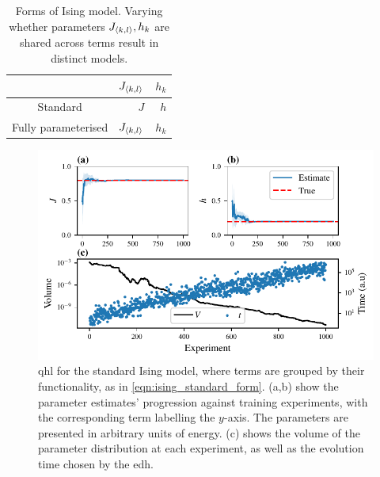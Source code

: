 \begin{table}[H]
    \begin{center}
        \begin{tabular}{crr}
             & $J_{{ \langle k, l \rangle }}$  & $h_{k}$ \\
            \hline
            Standard & $J$ & $h$ \\
            Fully parameterised & $J_{{ \langle k, l \rangle }}$ & $h_{k}$
        \end{tabular}
    \end{center}
    \caption[Forms of Ising model]{Forms of Ising model. Varying whether parameters $J_{{ \langle k, l \rangle }}, h_k$ are shared 
        across terms result in distinct models. 
    }
    \label{table:ising_models}
\end{table}

\par 

\begin{figure}[t]
    \begin{center}
        \includegraphics{theoretical_study/figures/standard_ising_qhl.pdf}
    \end{center}

    \caption[ for the standard Ising model]{
        \Acrlong{qhl} for the standard Ising model, where terms are grouped by their functionality, 
        as in \cref{eqn:ising_standard_form}. 
        (a,b) show the parameter estimates' progression against training experiments, 
            with the corresponding term labelling the $y$-axis. 
        The parameters are presented in arbitrary units of energy. 
        (c) shows the \gls{volume} of the parameter distribution at each experiment, 
            as well as the evolution time chosen by the \gls{edh}. 
        \figtableref
    }
    \label{fig:ising_two_param_learning}
\end{figure}

